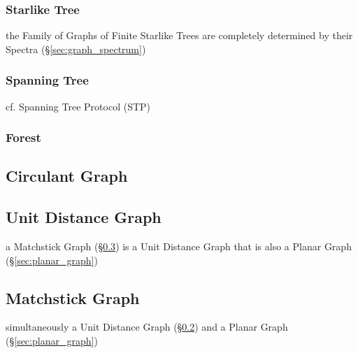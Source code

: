 \subsubsection{Starlike Tree}\label{sec:starlike_tree}

the Family of Graphs of Finite Starlike Trees are completely determined by
their Spectra (\S\ref{sec:graph_spectrum})



\subsubsection{Spanning Tree}\label{sec:spanning_tree}

cf. Spanning Tree Protocol (STP)



\subsubsection{Forest}\label{sec:forest}



\subsection{Circulant Graph}\label{sec:circulant_graph}

\subsection{Unit Distance Graph}\label{sec:unit_distance_graph}

a Matchstick Graph (\S\ref{sec:matchstick_graph}) is a Unit Distance Graph that
is also a Planar Graph (\S\ref{sec:planar_graph})



\subsection{Matchstick Graph}\label{sec:matchstick_graph}

simultaneously a Unit Distance Graph (\S\ref{sec:unit_distance_graph}) and a
Planar Graph (\S\ref{sec:planar_graph})



